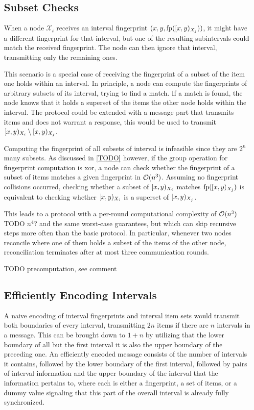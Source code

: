 \subsection{Subset Checks}
\label{subset-checks}

When a node $\mathcal{X}_i$ receives an interval fingerprint $({x}, {y}, {\operatorname{fp}([{x},{y})_{X_j})})$, it might have a different fingerprint for that interval, but one of the resulting subintervals could match the received fingerprint. The node can then ignore that interval, transmitting only the remaining ones.

This scenario is a special case of receiving the fingerprint of a subset of the item one holds within an interval. In principle, a node can compute the fingerprints of arbitrary subsets of its interval, trying to find a match. If a match is found, the node knows that it holds a superset of the items the other node holds within the interval. The protocol could be extended with a message part that transmits items and does not warrant a response, this would be used to transmit $[{x},{y})_{X_i} \setminus [{x},{y})_{X_j}$.

Computing the fingerprint of all subsets of interval is infeasible since they are $2^n$ many subsets. As discussed in \cref{TODO} however, if the group operation for fingerprint computation is xor, a node can check whether the fingerprint of a subset of items matches a given fingerprint in $\mathcal{O}(n^3)$.
Assuming no fingerprint collisions occurred, checking whether a subset of $[{x},{y})_{X_i}$ matches $\operatorname{fp}([{x},{y})_{X_j})$ is equivalent to checking whether $[{x},{y})_{X_i}$ is a superset of $[{x},{y})_{X_j}$.

This leads to a protocol with a per-round computational complexity of $\mathcal{O}(n^3)$ TODO $n^4$? and the same worst-case guarantees, but which can skip recursive steps more often than the basic protocol. In particular, whenever two nodes reconcile where one of them holds a subset of the items of the other node, reconciliation terminates after at most three communication rounds.

TODO precomputation, see comment %

\subsection{Efficiently Encoding Intervals}

A naive encoding of interval fingerprints and interval item sets would transmit both boundaries of every interval, transmitting $2n$ items if there are $n$ intervals in a message. This can be brought down to $1 + n$ by utilizing that the lower boundary of all but the first interval it is also the upper boundary of the preceding one. An efficiently encoded message consists of the number of intervals it contains, followed by the lower boundary of the first interval, followed by pairs of interval information and the upper boundary of the interval that the information pertains to, where each  is either a fingerprint, a set of items, or a dummy value signaling that this part of the overall interval is already fully synchronized.

